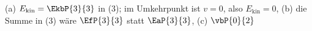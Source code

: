 (a) $E_\mathrm{kin} = \EkbP{3}{3}$ in (3); im Umkehrpunkt ist $v = 0$, also $E_\mathrm{kin} = 0$, (b) die Summe in (3) wäre $\EfP{3}{3}$ statt $\EaP{3}{3}$, (c) $\vbP{0}{2}$
